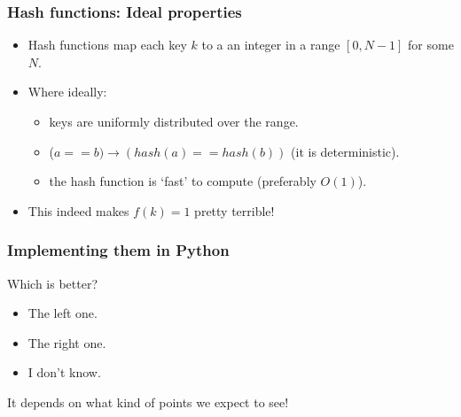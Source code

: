 \begin{frame}
	\frametitle{Hash functions: Ideal properties}
	
		\begin{itemize}
			\item Hash functions map each key $k$ to a an integer in a range $[0, N-1]$ for some $N$.
			\item Where ideally:
			
			\begin{itemize}
				\item keys are uniformly distributed over the range.
					
				\item ($a == b) \to (\mathit{hash}(a) == \mathit{hash}(b))$ (it is deterministic).
					
				\item the hash function is `fast' to compute (preferably $O(1)$).
			\end{itemize}
			\item This indeed makes $f(k) = 1$ pretty terrible!
			\end{itemize}	
\end{frame}

\begin{frame}
	\frametitle{Implementing them in Python}

	Which is better?	
			\begin{itemize}
			\item The left one.
			\item The right one.
			\item I don't know.
		\end{itemize}
		
			It depends on what kind of points we expect to see!

		
	\begin{columns}[T]
			
		
		
	\end{columns}
	


		
\end{frame}


